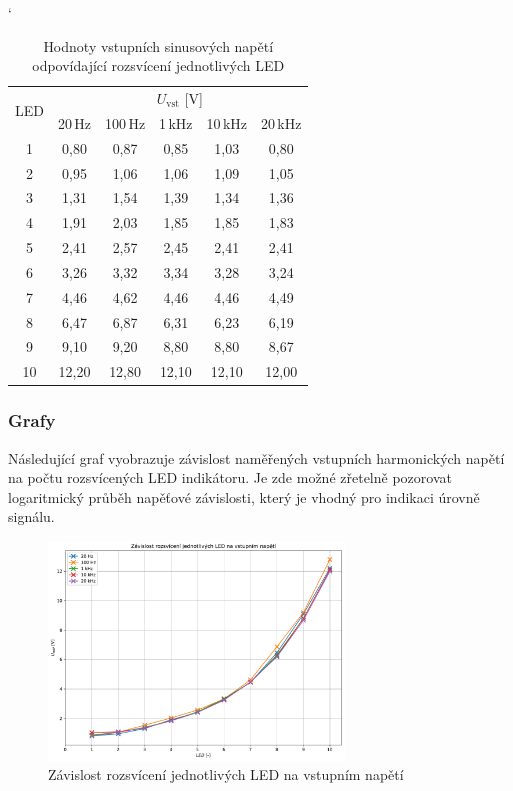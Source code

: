 \documentclass[a4paper, czech]{article}
\begin{document}
\begin{table}[H]
    \catcode`
    \centering
    \caption{Hodnoty vstupních sinusových napětí odpovídající rozsvícení jednotlivých LED}
    \begin{tabular}{cccccc}
        \toprule
        \multirow{2}{*}{LED} & \multicolumn{5}{c}{$U_{\text{vst}}$ [V]} \\
        \cmidrule(rl){2-6}
            & 20\,Hz    & 100\,Hz   & 1\,kHz  & 10\,kHz & 20\,kHz \\
        \midrule
        1   & 0,80  & 0,87  & 0,85  & 1,03  & 0,80  \\
        2   & 0,95  & 1,06  & 1,06  & 1,09  & 1,05  \\
        3   & 1,31  & 1,54  & 1,39  & 1,34  & 1,36  \\
        4   & 1,91  & 2,03  & 1,85  & 1,85  & 1,83  \\
        5   & 2,41  & 2,57  & 2,45  & 2,41  & 2,41  \\
        6   & 3,26  & 3,32  & 3,34  & 3,28  & 3,24  \\
        7   & 4,46  & 4,62  & 4,46  & 4,46  & 4,49  \\
        8   & 6,47  & 6,87  & 6,31  & 6,23  & 6,19  \\
        9   & 9,10  & 9,20  & 8,80  & 8,80  & 8,67  \\
        10  & 12,20 & 12,80 & 12,10 & 12,10 & 12,00 \\
        \bottomrule
    \end{tabular}
\end{table}

\subsubsection{Grafy}

Následující graf vyobrazuje závislost naměřených vstupních harmonických napětí na počtu rozsvícených LED indikátoru.
Je zde možné zřetelně pozorovat logaritmický průběh napěťové závislosti, který je vhodný pro indikaci úrovně signálu.

\begin{figure}[H]
    \centering
    \includegraphics[width=0.7\textwidth]{grafy/graf1.pdf}
    \caption{Závislost rozsvícení jednotlivých LED na vstupním napětí}
\end{figure}
\end{document}
